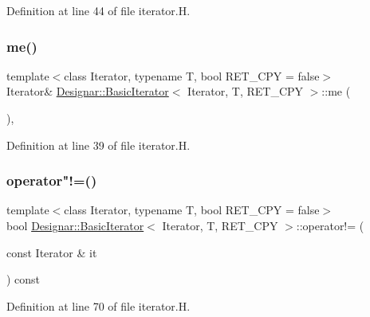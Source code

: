 Definition at line 44 of file iterator.\+H.

\mbox{\label{class_designar_1_1_basic_iterator_a5b550cbd8bb7ee464e8cdb6b023c437a}} 
\subsubsection{\texorpdfstring{me()}{me()}}
{\footnotesize\ttfamily template$<$class Iterator, typename T, bool R\+E\+T\+\_\+\+C\+PY = false$>$ \\
Iterator\& \hyperlink{class_designar_1_1_basic_iterator}{Designar\+::\+Basic\+Iterator}$<$ Iterator, T, R\+E\+T\+\_\+\+C\+PY $>$\+::me (\begin{DoxyParamCaption}{ }\end{DoxyParamCaption})\hspace{0.3cm}{\ttfamily [inline]}, {\ttfamily [protected]}}



Definition at line 39 of file iterator.\+H.

\mbox{\label{class_designar_1_1_basic_iterator_aea51bca6ffed62c081aefbcb804a21f1}} 
\subsubsection{\texorpdfstring{operator"!=()}{operator!=()}}
{\footnotesize\ttfamily template$<$class Iterator, typename T, bool R\+E\+T\+\_\+\+C\+PY = false$>$ \\
bool \hyperlink{class_designar_1_1_basic_iterator}{Designar\+::\+Basic\+Iterator}$<$ Iterator, T, R\+E\+T\+\_\+\+C\+PY $>$\+::operator!= (\begin{DoxyParamCaption}\item[{const Iterator \&}]{it }\end{DoxyParamCaption}) const\hspace{0.3cm}{\ttfamily [inline]}}



Definition at line 70 of file iterator.\+H.

\mbox{\label{class_designar_1_1_basic_iterator_aed614b1aca7f9cb1552699b106bb281f}} 
